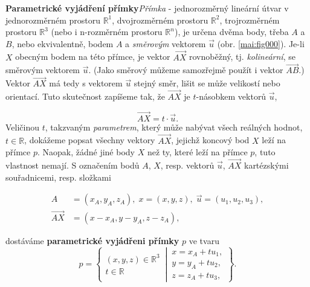 \begin{mdframed}[style=mdexam]
\begin{example}\label{mai:exam001}
  \textbf{Parametrické vyjádření přímky}\newline\emph{Přímka} - jednorozměrný lineární útvar
  v jednorozměrném prostoru \(\mathbb{R}^1\), dvojrozměrném prostoru \(\mathbb{R}^2\), trojrozměrném
  prostoru \(\mathbb{R}^3\) (nebo i n-rozměrném prostoru \(\mathbb{R}^n\)), je určena dvěma body,
  třeba \(A\) a \(B\), nebo ekvivalentně, bodem \(A\) a \emph{směrovým} vektorem \(\vec{u}\) (obr.
  \ref{mai:fig000}). Je-li \(X\) obecným bodem na této přímce, je vektor \(\overrightarrow{AX}\)
  rovnoběžný, tj. \emph{kolineární}, se směrovým vektorem \(\vec{u}\). (Jako směrový můžeme
  samozřejmě použít i vektor \(\overrightarrow{AB}\).) Vektor \(\overrightarrow{AX}\) má tedy s
  vektorem \(\vec{u}\) stejný směr, lišit se může velikostí nebo orientací. Tuto skutečnost zapíšeme
  tak, že \(\overrightarrow{AX}\) je \(t\)-násobkem vektorů \(\vec{u}\),
  
  \begin{equation*}
    \overrightarrow{AX} = t \cdot \vec{u}.
  \end{equation*}
  Veličinou \(t\), takzvaným \emph{parametrem}, který může nabývat všech reálných hodnot,
  \(t\in\mathbb{R}\), dokážeme popsat všechny vektory \(\overrightarrow{AX}\), jejichž koncový
  bod \(X\) leží na přímce \(p\). Naopak, žádné jiné body \(X\) než ty, které leží na přímce
  \(p\), tuto vlastnost nemají. S označením bodů \(A\), \(X\), resp. vektorů \(\vec{u}\),
  \(\overrightarrow{AX}\) kartézskými souřadnicemi, resp. složkami

  \begin{align*}
    A &= (x_A,y_A, z_A), \; x =(x,y,z),\; \vec{u} = (u_1,u_2,u_3),  \\ 
    \overrightarrow{AX} &= (x - x_A, y - y_A, z-z_A),
  \end{align*}

  { \centering
    \captionsetup{type=figure}
  \par}

  dostáváme \textbf{parametrické vyjádřeni přímky} \(p\) ve tvaru
  \begin{equation*}
    p = \left\{
      \begin{matrix}  
        (x,y,z)\in\mathbb{R}^3  \\
              t \in\mathbb{R}
      \end{matrix}
    \,\left\lvert\,
      \begin{matrix}
        x = x_A + tu_1,        \\
        y = y_A + tu_2,        \\
        z = z_A + tu_3,
      \end{matrix}\right.
    \right\}. 
  \end{equation*}
  \normalsize
\end{example}
\end{mdframed}